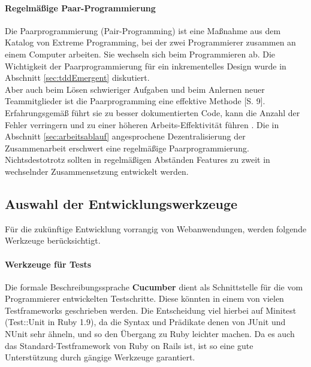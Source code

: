 \paragraph{Regelmäßige Paar-Programmierung} Die Paarprogrammierung (Pair-Programming) ist eine Maßnahme aus dem Katalog von Extreme Programming, bei der zwei Programmierer zusammen an einem Computer arbeiten. Sie wechseln sich beim Programmieren ab. Die Wichtigkeit der Paarprogrammierung für ein inkrementelles Design wurde in Abschnitt \ref{sec:tddEmergent} diskutiert.\\ Aber auch beim Lösen schwieriger Aufgaben und beim Anlernen neuer Teammitglieder ist die Paarprogramming eine effektive Methode \citep{hulkko_multiple_2005}[S. 9]. Erfahrungsgemäß führt sie zu besser dokumentierten Code, kann die Anzahl der Fehler verringern und zu einer höheren Arbeits-Effektivität führen \citep{hulkko_multiple_2005}.
Die in Abschnitt \ref{sec:arbeitsablauf} angesprochene Dezentralisierung der Zusammenarbeit erschwert eine regelmäßige Paarprogrammierung. Nichtsdestotrotz sollten in regelmäßigen Abständen Features zu zweit in wechselnder Zusammensetzung entwickelt werden.


\subsection{Auswahl der Entwicklungswerkzeuge}
\label{sec:devtools}

Für die zukünftige Entwicklung vorrangig von Webanwendungen, werden folgende Werkzeuge berücksichtigt.

\paragraph{Werkzeuge für Tests} Die formale Beschreibungssprache \textbf{Cucumber} dient als Schnittstelle für die vom Programmierer entwickelten Testschritte. Diese könnten in einem von vielen Testframeworks geschrieben werden. Die Entscheidung viel hierbei auf Minitest (Test::Unit in Ruby 1.9), da die Syntax und Prädikate denen von JUnit und NUnit sehr ähneln, und so den Übergang zu Ruby leichter machen. Da es auch das Standard-Testframework von Ruby on Rails ist, ist so eine gute Unterstützung durch gängige Werkzeuge garantiert.

